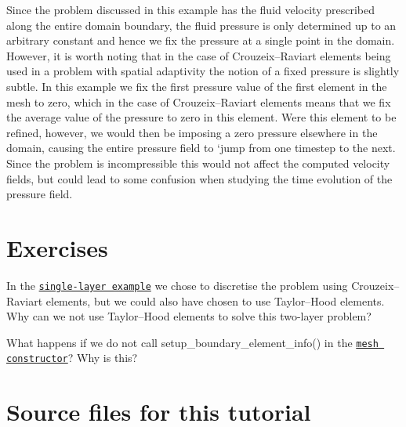 \begin{DoxyItemize}
\item Since the problem discussed in this example has the fluid velocity prescribed along the entire domain boundary, the fluid pressure is only determined up to an arbitrary constant and hence we fix the pressure at a single point in the domain. However, it is worth noting that in the case of Crouzeix--Raviart elements being used in a problem with spatial adaptivity the notion of a fixed pressure is slightly subtle. In this example we fix the first pressure value of the first element in the mesh to zero, which in the case of Crouzeix--Raviart elements means that we fix the average value of the pressure to zero in this element. Were this element to be refined, however, we would then be imposing a zero pressure elsewhere in the domain, causing the entire pressure field to `jump\textquotesingle{} from one timestep to the next. Since the problem is incompressible this would not affect the computed velocity fields, but could lead to some confusion when studying the time evolution of the pressure field.
\end{DoxyItemize}



 

\hypertarget{index_exercises}{}\section{Exercises}\label{index_exercises}

\begin{DoxyItemize}
\item In the \href{../../single_layer_free_surface/html/index.html}{\tt single-\/layer example} we chose to discretise the problem using Crouzeix--Raviart elements, but we could also have chosen to use Taylor--Hood elements. Why can we not use Taylor--Hood elements to solve this two-\/layer problem?
\item What happens if we do not call {\ttfamily setup\+\_\+boundary\+\_\+element\+\_\+info()} in the \href{#mesh}{\tt mesh constructor}? Why is this?
\end{DoxyItemize}



 

\hypertarget{index_sources}{}\section{Source files for this tutorial}\label{index_sources}

